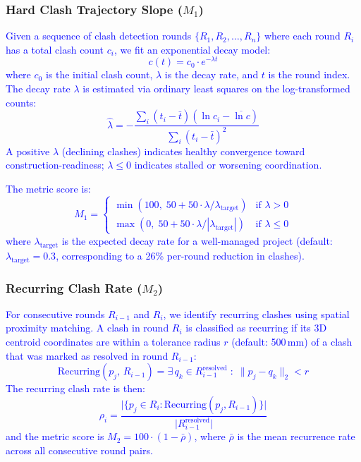 \documentclass[conference]{IEEEtran}
\newcommand{\placeholder}[1]{\textcolor{blue}{#1}}
\begin{document}
\subsubsection{Hard Clash Trajectory Slope ($M_1$)}
\placeholder{
Given a sequence of clash detection rounds $\{R_1, R_2, \ldots, R_n\}$ where each round $R_i$ has a total clash count $c_i$, we fit an exponential decay model:
\begin{equation}
    c(t) = c_0 \cdot e^{-\lambda t}
    \label{eq:decay}
\end{equation}
where $c_0$ is the initial clash count, $\lambda$ is the decay rate, and $t$ is the round index. The decay rate $\lambda$ is estimated via ordinary least squares on the log-transformed counts:
\begin{equation}
    \hat{\lambda} = -\frac{\sum_i (t_i - \bar{t})(\ln c_i - \overline{\ln c})}{\sum_i (t_i - \bar{t})^2}
\end{equation}
A positive $\lambda$ (declining clashes) indicates healthy convergence toward construction-readiness; $\lambda \leq 0$ indicates stalled or worsening coordination.

The metric score is:
\begin{equation}
    M_1 = \begin{cases}
        \min(100,\; 50 + 50 \cdot \lambda / \lambda_{\text{target}}) & \text{if } \lambda > 0 \\
        \max(0,\; 50 + 50 \cdot \lambda / |\lambda_{\text{target}}|) & \text{if } \lambda \leq 0
    \end{cases}
\end{equation}
where $\lambda_{\text{target}}$ is the expected decay rate for a well-managed project (default: $\lambda_{\text{target}} = 0.3$, corresponding to a 26\% per-round reduction in clashes).
}

\subsubsection{Recurring Clash Rate ($M_2$)}
\placeholder{
For consecutive rounds $R_{i-1}$ and $R_i$, we identify recurring clashes using spatial proximity matching. A clash in round $R_i$ is classified as recurring if its 3D centroid coordinates are within a tolerance radius $r$ (default: 500\,mm) of a clash that was marked as resolved in round $R_{i-1}$:
\begin{equation}
    \text{Recurring}(p_j,\, R_{i-1}) = \exists\, q_k \in R_{i-1}^{\text{resolved}} \;:\; \|p_j - q_k\|_2 < r
\end{equation}
The recurring clash rate is then:
\begin{equation}
    \rho_i = \frac{\bigl|\{p_j \in R_i : \text{Recurring}(p_j, R_{i-1})\}\bigr|}{\bigl|R_{i-1}^{\text{resolved}}\bigr|}
\end{equation}
and the metric score is $M_2 = 100 \cdot (1 - \bar{\rho})$, where $\bar{\rho}$ is the mean recurrence rate across all consecutive round pairs.
}
\end{document}
